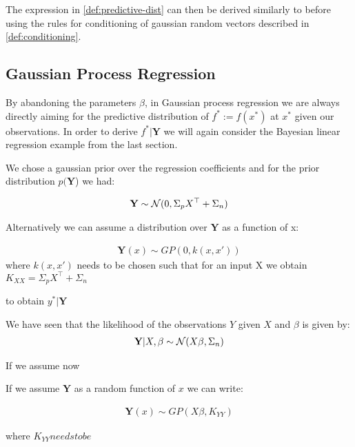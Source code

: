 The expression in \ref{def:predictive-dist} can then be derived similarly to before using the rules for
conditioning of gaussian random vectors described in \ref{def:conditioning}.

\subsection{Gaussian Process Regression}
By abandoning the parameters $\beta$, in Gaussian process regression we are always
directly aiming for the predictive distribution of
$f^{\ast} := f(x^{\ast})$ at $x^{\ast}$ given our observations.
In order to derive $f^{\ast}|\mathbf{Y}$
we will again consider the Bayesian linear regression example from the last section.

We chose a gaussian prior over the regression coefficients and for the prior distribution $p(\mathbf{Y}$) we had:

\begin{gather*}
    \mathbf{Y} \sim \operatorname{\mathcal{N}}(0,  \Sigma_p X^{\top} + \Sigma_n)
\end{gather*}

Alternatively we can assume a distribution over $\mathbf{Y}$ as a function of x:

\begin{gather*}
    \mathbf{Y}(x) \sim GP(0, k(x, x'))
\end{gather*}
where $k(x,x')$ needs to be chosen such that for an input X we obtain $K_{XX} =  \Sigma_p X^{\top} + \Sigma_n$


to obtain $y^{\ast}|\mathbf{Y}$

We have seen that the likelihood of the observations $Y$ given $X$ and $\beta$ is given by:
\begin{gather*}
    \mathbf{Y}|X,\beta \sim \operatorname{\mathcal{N}}(X \beta, \Sigma_n)
\end{gather*}

If we assume now

If we assume $\mathbf{Y}$ as a random function of $x$ we can write:

\begin{gather*}
    \mathbf{Y}(x) \sim GP(X \beta, K_{YY})
\end{gather*}

where $K_{YY} needs to be $



